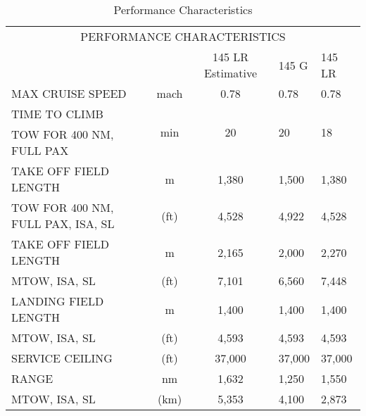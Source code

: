\begin{table}[H]
  \centering
  \caption{Performance Characteristics}
    \begin{tabular}{rcc p{2cm} p{2cm}}
    \toprule
    \multicolumn{5}{c}{\multirow{2}[1]{*}{PERFORMANCE CHARACTERISTICS}} \\ 
    \multicolumn{5}{c}{} \\
    \midrule
    \multicolumn{2}{c}{} & 145 LR Estimative & 145 G & 145 LR \\
    \midrule
    \multicolumn{1}{l}{\multirow{2}[2]{*}{MAX CRUISE SPEED}} & \multirow{2}[2]{*}{mach} & \multirow{2}[2]{*}{0.78} & \multirow{2}[2]{*}{0.78} & \multirow{2}[2]{*}{0.78} \\    
    \multicolumn{1}{l}{} &       &       &       &  \\
    \midrule
    \multicolumn{1}{l}{TIME TO CLIMB} & \multirow{2}[2]{*}{min} & \multirow{2}[2]{*}{20} & \multirow{2}[2]{*}{20} & \multirow{2}[2]{*}{18} \\
    \multicolumn{1}{l}{\scriptsize TOW FOR 400 NM, FULL PAX} &       &       &       &  \\
    \midrule
    \multicolumn{1}{l}{TAKE OFF FIELD LENGTH} & m     & 1,380 & 1,500 & 1,380 \\
    \multicolumn{1}{l}{\scriptsize TOW FOR 400 NM, FULL PAX, ISA, SL} & (ft)  & 4,528 & 4,922 & 4,528 \\
    \midrule
    \multicolumn{1}{l}{TAKE OFF FIELD LENGTH} & m     & 2,165 & 2,000 & 2,270 \\
    \multicolumn{1}{l}{\scriptsize MTOW, ISA, SL} & (ft)  & 7,101 & 6,560 & 7,448 \\
    \midrule
    \multicolumn{1}{l}{LANDING FIELD LENGTH} & m     & 1,400 & 1,400 & 1,400 \\
    \multicolumn{1}{l}{\scriptsize MTOW, ISA, SL} & (ft)  & 4,593 & 4,593 & 4,593 \\
    \midrule
    \multicolumn{1}{l}{\multirow{2}[2]{*}{SERVICE CEILING}} & \multirow{2}[2]{*}{(ft)} & \multirow{2}[2]{*}{37,000} & \multirow{2}[2]{*}{37,000} & \multirow{2}[2]{*}{37,000} \\
    \multicolumn{1}{l}{} &       &       &       &  \\
    \midrule
    \multicolumn{1}{l}{RANGE} & nm    & 1,632 & 1,250 & 1,550 \\
    \multicolumn{1}{l}{\scriptsize MTOW, ISA, SL} & (km)  & 5,353 & 4,100 & 2,873 \\
    \bottomrule
    \end{tabular}%
  \label{tab:addlabel}%
\end{table}%

